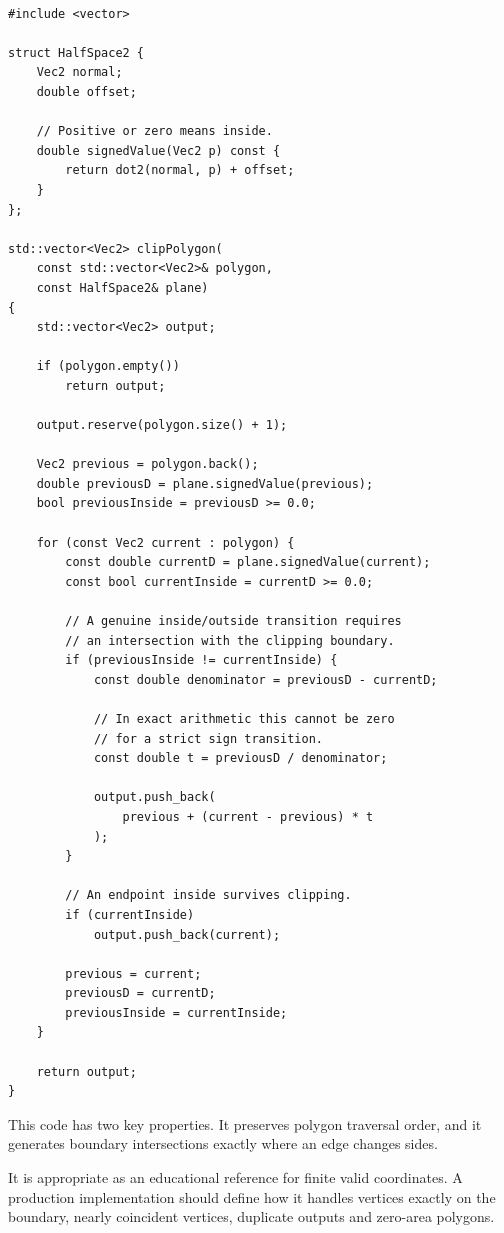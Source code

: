 \begin{verbatim}

#include <vector>

struct HalfSpace2 {
    Vec2 normal;
    double offset;

    // Positive or zero means inside.
    double signedValue(Vec2 p) const {
        return dot2(normal, p) + offset;
    }
};

std::vector<Vec2> clipPolygon(
    const std::vector<Vec2>& polygon,
    const HalfSpace2& plane)
{
    std::vector<Vec2> output;

    if (polygon.empty())
        return output;

    output.reserve(polygon.size() + 1);

    Vec2 previous = polygon.back();
    double previousD = plane.signedValue(previous);
    bool previousInside = previousD >= 0.0;

    for (const Vec2 current : polygon) {
        const double currentD = plane.signedValue(current);
        const bool currentInside = currentD >= 0.0;

        // A genuine inside/outside transition requires
        // an intersection with the clipping boundary.
        if (previousInside != currentInside) {
            const double denominator = previousD - currentD;

            // In exact arithmetic this cannot be zero
            // for a strict sign transition.
            const double t = previousD / denominator;

            output.push_back(
                previous + (current - previous) * t
            );
        }

        // An endpoint inside survives clipping.
        if (currentInside)
            output.push_back(current);

        previous = current;
        previousD = currentD;
        previousInside = currentInside;
    }

    return output;
}
\end{verbatim}

This code has two key properties. It preserves polygon traversal order, and it generates boundary intersections exactly where an edge changes sides.

It is appropriate as an educational reference for finite valid coordinates. A production implementation should define how it handles vertices exactly on the boundary, nearly coincident vertices, duplicate outputs and zero-area polygons.

